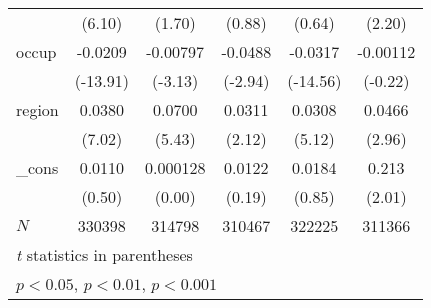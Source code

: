 \begin{table}[htbp]
\begin{tabular}{l*{5}{c}}
            &      (6.10)         &      (1.70)         &      (0.88)         &      (0.64)         &      (2.20)         \\
occup       &     -0.0209\sym{***}&    -0.00797\sym{**} &     -0.0488\sym{**} &     -0.0317\sym{***}&    -0.00112         \\
            &    (-13.91)         &     (-3.13)         &     (-2.94)         &    (-14.56)         &     (-0.22)         \\
region      &      0.0380\sym{***}&      0.0700\sym{***}&      0.0311\sym{*}  &      0.0308\sym{***}&      0.0466\sym{**} \\
            &      (7.02)         &      (5.43)         &      (2.12)         &      (5.12)         &      (2.96)         \\
\_cons      &      0.0110         &    0.000128         &      0.0122         &      0.0184         &       0.213\sym{*}  \\
            &      (0.50)         &      (0.00)         &      (0.19)         &      (0.85)         &      (2.01)         \\
\hline
\(N\)       &      330398         &      314798         &      310467         &      322225         &      311366         \\
\hline\hline
\multicolumn{6}{l}{\footnotesize \textit{t} statistics in parentheses}\\
\multicolumn{6}{l}{\footnotesize \sym{*} \(p<0.05\), \sym{**} \(p<0.01\), \sym{***} \(p<0.001\)}\\
\end{tabular}
\label{tab:oaxaca_male}
\end{table}
